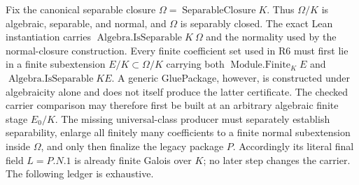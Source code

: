 Fix the canonical separable closure
\(\Omega=\operatorname{SeparableClosure}K\).  Thus \(\Omega/K\) is algebraic,
separable, and normal, and \(\Omega\) is separably closed.  The exact Lean
instantiation carries \(\operatorname{Algebra.IsSeparable} K\ \Omega\) and the
normality used by the normal-closure construction.  Every finite coefficient
set used in R6 must first lie in a finite subextension
\(E/K\subset\Omega/K\) carrying both \(\operatorname{Module.Finite}_K E\) and
\(\operatorname{Algebra.IsSeparable} K E\).  A generic GluePackage, however,
is constructed under algebraicity alone and does not itself produce the latter
certificate.  The checked carrier comparison may therefore first be built at
an arbitrary algebraic finite stage \(E_0/K\).  The missing universal-class
producer must separately establish separability, enlarge all finitely many
coefficients to a finite normal subextension inside \(\Omega\), and only then
finalize the legacy package \(P\).
Accordingly its literal final field \(L=P.N.1\) is already finite Galois over
\(K\); no later step changes the carrier.  The following ledger is exhaustive.

